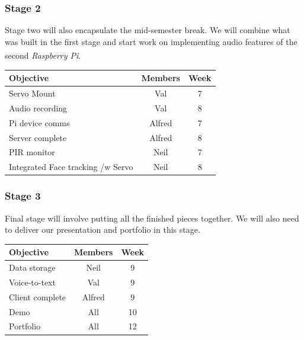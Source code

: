 \documentclass[11pt,a4paper,titlepage]{report}
\newcommand{\rpi}{\textit{Raspberry Pi\textsuperscript{\textregistered}}}
\begin{document}
\subsubsection{Stage 2}

Stage two will also encapsulate the mid-semester break. We will combine what was built in the first stage and start work on implementing audio features of the second \rpi.

\begin{center}
\begin{table}[H]
\begin{tabular}{|l|c|c|}
    \hline
    \textbf{Objective} & \textbf{Members} & \textbf{Week} \\ \hline
    
    Servo Mount & Val & 7 \\ \hline
    Audio recording & Val & 8 \\ \hline
    Pi device comms & Alfred & 7 \\ \hline
    Server complete & Alfred & 8 \\ \hline
    PIR monitor & Neil & 7 \\ \hline
    Integrated Face tracking /w Servo & Neil & 8 \\ \hline


\end{tabular}
\end{table}
\end{center}


\subsubsection{Stage 3}

Final stage will involve putting all the finished pieces together. We will also need to deliver our presentation and portfolio in this stage.


\begin{center}
\begin{table}[H]
\begin{tabular}{|l|c|c|}
    \hline
    \textbf{Objective} & \textbf{Members} & \textbf{Week} \\ \hline

    Data storage & Neil & 9 \\ \hline    
    Voice-to-text & Val & 9 \\ \hline    
    Client complete & Alfred & 9 \\ \hline    
    Demo & All & 10 \\ \hline    
    Portfolio & All & 12 \\ \hline    

\end{tabular}
\end{table}
\end{center}
\end{document}
